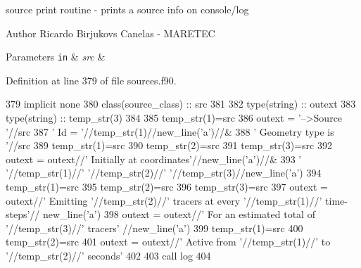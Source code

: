 source print routine -\/ prints a source info on console/log 

\begin{DoxyAuthor}{Author}
Ricardo Birjukovs Canelas -\/ M\+A\+R\+E\+T\+EC 
\end{DoxyAuthor}

\begin{DoxyParams}[1]{Parameters}
\mbox{\tt in}  & {\em src} & \\
\hline
\end{DoxyParams}


Definition at line 379 of file sources.\+f90.


\begin{DoxyCode}
379     \textcolor{keywordtype}{implicit none}
380     \textcolor{keywordtype}{class}(source\_class) :: src
381 
382     \textcolor{keywordtype}{type}(string) :: outext
383     \textcolor{keywordtype}{type}(string) :: temp\_str(3)
384 
385     temp\_str(1)=src%
386     outext = \textcolor{stringliteral}{'-->Source '}//src%
387         \textcolor{stringliteral}{'       Id = '}//temp\_str(1)//new\_line(\textcolor{stringliteral}{'a'})//&
388         \textcolor{stringliteral}{'       Geometry type is '}//src%
389     temp\_str(1)=src%
390     temp\_str(2)=src%
391     temp\_str(3)=src%
392     outext = outext//\textcolor{stringliteral}{'       Initially at coordinates'}//new\_line(\textcolor{stringliteral}{'a'})//&
393         \textcolor{stringliteral}{'       '}//temp\_str(1)//\textcolor{stringliteral}{' '}//temp\_str(2)//\textcolor{stringliteral}{' '}//temp\_str(3)//new\_line(\textcolor{stringliteral}{'a'})
394     temp\_str(1)=src%
395     temp\_str(2)=src%
396     temp\_str(3)=src%
397     outext = outext//\textcolor{stringliteral}{'       Emitting '}//temp\_str(2)//\textcolor{stringliteral}{' tracers at every '}//temp\_str(1)//\textcolor{stringliteral}{' time-steps'}//
      new\_line(\textcolor{stringliteral}{'a'})
398     outext = outext//\textcolor{stringliteral}{'       For an estimated total of '}//temp\_str(3)//\textcolor{stringliteral}{' tracers'} //new\_line(\textcolor{stringliteral}{'a'})
399     temp\_str(1)=src%
400     temp\_str(2)=src%
401     outext = outext//\textcolor{stringliteral}{'       Active from '}//temp\_str(1)//\textcolor{stringliteral}{' to '}//temp\_str(2)//\textcolor{stringliteral}{' seconds'}
402 
403     \textcolor{keyword}{call }log%
404 
\end{DoxyCode}
\mbox{\label{namespacesources__mod_a9a62c41b71d2d6ad85def74087542ef5}} 
